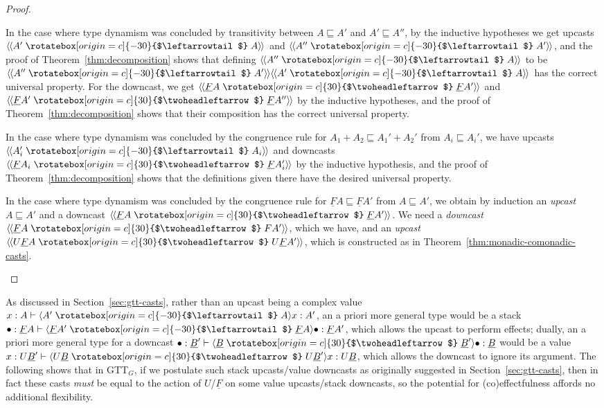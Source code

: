 \documentclass[acmsmall,nonacm]{acmart}
\renewcommand{\u}{\underline}
\newcommand{\ltdyn}{\sqsubseteq}
\newcommand{\uarrow}{\mathrel{\rotatebox[origin=c]{-30}{$\leftarrowtail$}}}
\newcommand{\darrow}{\mathrel{\rotatebox[origin=c]{30}{$\twoheadleftarrow$}}}
\newcommand{\upcast}[2]{\langle{#2}\uarrow{#1}\rangle}
\newcommand{\dncast}[2]{\langle{#1}\darrow{#2}\rangle}
\newcommand{\defupcast}[2]{\langle\kern-1ex~\langle{#2}\uarrow{#1}\rangle\kern-1ex~\rangle}
\newcommand{\defdncast}[2]{\langle\kern-1ex~\langle{#1}\darrow{#2}\rangle\kern-1ex~\rangle}
\begin{document}
\begin{proof}
\begin{longonly}
  In the case where type dynamism was concluded by
  transitivity between $A \ltdyn A'$ and $A' \ltdyn A''$, by the
  inductive hypotheses we get upcasts $\defupcast{A}{A'}$ and
  $\defupcast{A'}{A''}$, and the proof of
   Theorem~\ref{thm:decomposition} shows that defining
  $\defupcast{A}{A''}$ to be $\defupcast{A'}{A''}{\defupcast{A}{A'}}$
  has the correct universal property.  For the downcast, we get
  $\defdncast{\u F A}{\u F A'}$ and
  $\defdncast{\u F A'}{\u F A''}$ by the inductive hypotheses, and the
  proof of Theorem~\ref{thm:decomposition} shows that their composition
  has the correct universal property.
  
  In the case where type dynamism was concluded by the congruence rule
  for $A_1 + A_2 \ltdyn A_1' + A_2'$ from $A_i \ltdyn A_i'$, we have
  upcasts $\defupcast{A_i}{A_i'}$ and downcasts $\defdncast{\u F A_i}{\u
    F A_i'}$ by the inductive hypothesis, and the proof of
  Theorem~\ref{thm:decomposition} shows that the definitions given there
  have the desired universal property.
  
  In the case where type dynamism was concluded by the congruence rule
  for $\u F A \ltdyn \u F A'$ from $A \ltdyn A'$, we obtain by induction
  an \emph{upcast} $A \ltdyn A'$ and a downcast $\defdncast{\u F A}{\u F A'}$.
  We need a 
  \emph{downcast} $\defdncast{\u F A}{F A'}$, which we have,
  and an \emph{upcast} $\defdncast{U \u F A}{U \u F A'}$, which is
  constructed as in Theorem~\ref{thm:monadic-comonadic-casts}.
  \end{longonly}
\end{proof}

As discussed in Section~\ref{sec:gtt-casts}, rather than an upcast being
a complex value $x : A \vdash \upcast{A}{A'}{x} : A'$, an a priori more
general type would be a stack $\bullet : \u F A \vdash \upcast{\u F
  A}{\u F A'}{\bullet} : \u F A'$, which allows the upcast to perform
effects; dually, an a priori more general type for a downcast $\bullet :
\u B' \vdash \dncast{\u B}{\u B'}{\bullet} : \u B$ would be a value $x :
U \u B' \vdash \dncast{U \u B}{U \u B'}{x} : U \u B$, which allows the
downcast to ignore its argument.  The following shows that in GTT$_G$,
if we postulate such stack upcasts/value downcasts as originally
suggested in Section~\ref{sec:gtt-casts}, then in fact these casts
\emph{must} be equal to the action of $U$/$\u F$ on some
value upcasts/stack downcasts, so the potential
for (co)effectfulness affords no additional flexibility.
\end{document}
